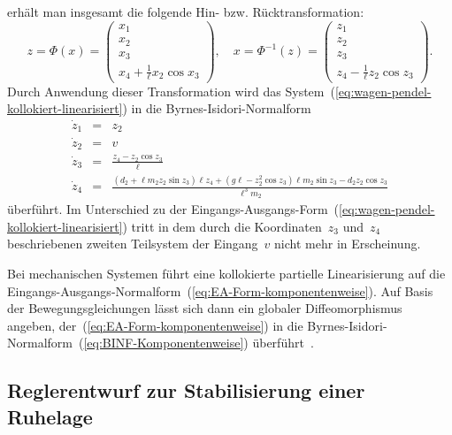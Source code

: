 \begin{example}
erhält man insgesamt die folgende Hin- bzw. Rücktransformation: 
\[
z=\Phi(x)=\left(\begin{array}{c}
x_{1}\\
x_{2}\\
x_{3}\\
x_{4}+\tfrac{1}{\ell}x_{2}\cos x_{3}
\end{array}\right),\quad x=\Phi^{-1}(z)=\left(\begin{array}{c}
z_{1}\\
z_{2}\\
z_{3}\\
z_{4}-\tfrac{1}{\ell}z_{2}\cos z_{3}
\end{array}\right).
\]
Durch Anwendung dieser Transformation wird das System~(\ref{eq:wagen-pendel-kollokiert-linearisiert})
in die Byrnes-Isidori-Normalform 
\begin{equation}
\begin{array}{lcl}
\dot{z}_{1} & = & z_{2}\\
\dot{z}_{2} & = & v\\
\dot{z}_{3} & = & \frac{z_{4}-z_{2}\cos z_{3}}{\ell}\\
\dot{z}_{4} & = & \frac{\left(d_{2}+\ell m_{2}z_{2}\sin z_{3}\right)\ell z_{4}+\left(g\ell-z_{2}^{2}\cos z_{3}\right)\ell m_{2}\sin z_{3}-d_{2}z_{2}\cos z_{3}}{\ell^{3}m_{2}}
\end{array}\label{eq:wagen-pendel-system-BINF}
\end{equation}
überführt. Im Unterschied zu der Eingangs-Ausgangs-Form~(\ref{eq:wagen-pendel-kollokiert-linearisiert})
tritt in dem durch die Koordinaten~$z_{3}$ und~$z_{4}$ beschriebenen
zweiten Teilsystem der Eingang~$v$ nicht mehr in Erscheinung.
\end{example}

\begin{remark}
Bei mechanischen Systemen führt eine kollokierte partielle Linearisierung
auf die Eingangs-Ausgangs-Normal\-form~(\ref{eq:EA-Form-komponentenweise}).
Auf Basis der Bewegungsgleichungen lässt sich dann ein globaler Diffeomorphismus
angeben, der~(\ref{eq:EA-Form-komponentenweise}) in die Byrnes-Isidori-Normalform~(\ref{eq:BINF-Komponentenweise})
überführt~\cite{knoll2015ssce,knoll2016diss}.
\end{remark}

\subsection{Reglerentwurf zur Stabilisierung einer Ruhelage\label{subsec:Reglerentwurf-zur-Stabilisierung-Ruhelage}}

